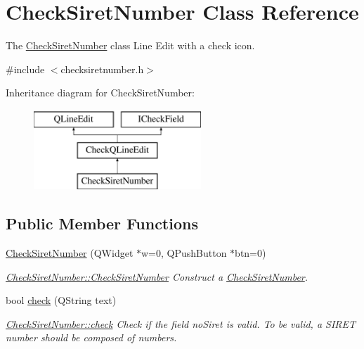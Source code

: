 \hypertarget{classCheckSiretNumber}{\section{Check\-Siret\-Number Class Reference}
\label{classCheckSiretNumber}
}


The \hyperlink{classCheckSiretNumber}{Check\-Siret\-Number} class Line Edit with a check icon.  




{\ttfamily \#include $<$checksiretnumber.\-h$>$}

Inheritance diagram for Check\-Siret\-Number\-:\begin{figure}[H]
\begin{center}
\leavevmode
\includegraphics[height=3.000000cm]{d7/d29/classCheckSiretNumber}
\end{center}
\end{figure}
\subsection*{Public Member Functions}
\begin{DoxyCompactItemize}
\item 
\hyperlink{classCheckSiretNumber_a0581c0a2d6c0c1a62dab77515422b194}{Check\-Siret\-Number} (Q\-Widget $\ast$w=0, Q\-Push\-Button $\ast$btn=0)
\begin{DoxyCompactList}\small\item\em \hyperlink{classCheckSiretNumber_a0581c0a2d6c0c1a62dab77515422b194}{Check\-Siret\-Number\-::\-Check\-Siret\-Number} Construct a \hyperlink{classCheckSiretNumber}{Check\-Siret\-Number}. \end{DoxyCompactList}\item 
bool \hyperlink{classCheckSiretNumber_aaf0a1411e380789062564bd992e72c1b}{check} (Q\-String text)
\begin{DoxyCompactList}\small\item\em \hyperlink{classCheckSiretNumber_aaf0a1411e380789062564bd992e72c1b}{Check\-Siret\-Number\-::check} Check if the field no\-Siret is valid. To be valid, a S\-I\-R\-E\-T number should be composed of numbers. \end{DoxyCompactList}\end{DoxyCompactItemize}

